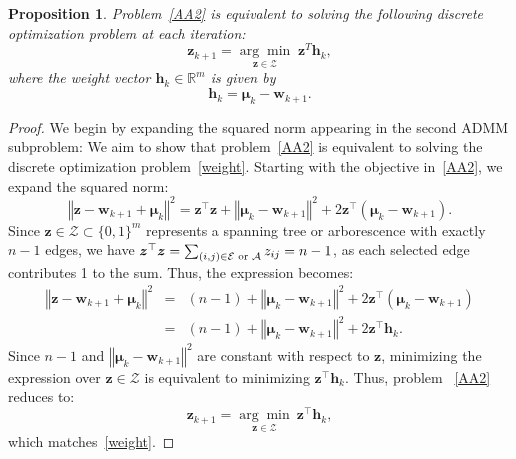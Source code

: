 \documentclass[10pt,a4paper]{amsart}
\newtheorem{proposition}{Proposition}
\begin{document}
	\begin{proposition}
		\label{Proposition} Problem~\eqref{AA2} is equivalent to solving the
		following discrete optimization problem at each iteration: 
		\begin{equation}
			\boldsymbol{z}_{k+1}=\underset{\boldsymbol{z}\in \mathcal{Z}}{\arg \min }\;%
			\boldsymbol{z}^{T}\boldsymbol{h}_{k},  \label{weight}
		\end{equation}%
		where the weight vector $\boldsymbol{h}_{k}\in \mathbb{R}^{m}$ is given by 
		\begin{equation}
			\boldsymbol{h}_{k}=\boldsymbol{\mu }_{k}-\boldsymbol{w}_{k+1}.  \label{h_k}
		\end{equation}%
	\end{proposition}

	\begin{proof}
		\label{Proof_prop} We begin by expanding the squared norm appearing in the
		second ADMM subproblem: We aim to show that problem~\eqref{AA2} is
		equivalent to solving the discrete optimization problem~\eqref{weight}.
		Starting with the objective in~\eqref{AA2}, we expand the squared norm: 
		\begin{equation*}
			\left\Vert \boldsymbol{z}-\boldsymbol{w}_{k+1}+\boldsymbol{\mu }%
			_{k}\right\Vert ^{2}=\boldsymbol{z}^{\top }\boldsymbol{z}+\left\Vert 
			\boldsymbol{\mu }_{k}-\boldsymbol{w}_{k+1}\right\Vert ^{2}+2\boldsymbol{z}%
			^{\top }\left( \boldsymbol{\mu }_{k}-\boldsymbol{w}_{k+1}\right) .
		\end{equation*}%
		Since $\boldsymbol{z}\in \mathcal{Z}\subset \{0,1\}^{m}$ represents a
		spanning tree or arborescence with exactly $n-1$ edges, we have $\boldsymbol{%
			z}^{\top }\boldsymbol{z}=\sum_{(i,j)\in \mathcal{E}\text{ or }\mathcal{A}%
		}z_{ij}=n-1$, as each selected edge contributes 1 to the sum. Thus, the
		expression becomes: 
		\begin{eqnarray*}
			\left\Vert \boldsymbol{z}-\boldsymbol{w}_{k+1}+\boldsymbol{\mu }%
			_{k}\right\Vert ^{2} &=&(n-1)+\left\Vert \boldsymbol{\mu }_{k}-\boldsymbol{w}%
			_{k+1}\right\Vert ^{2}+2\boldsymbol{z}^{\top }\left( \boldsymbol{\mu }_{k}-%
			\boldsymbol{w}_{k+1}\right)  \\
			&=&(n-1)+\left\Vert \boldsymbol{\mu }_{k}-\boldsymbol{w}_{k+1}\right\Vert
			^{2}+2\boldsymbol{z}^{\top }\boldsymbol{h}_{k}.
		\end{eqnarray*}%
		Since $n-1$ and $\left\Vert \boldsymbol{\mu }_{k}-\boldsymbol{w}%
		_{k+1}\right\Vert ^{2}$ are constant with respect to $\boldsymbol{z}$,
		minimizing the expression over $\boldsymbol{z}\in \mathcal{Z}$ is equivalent
		to minimizing $\boldsymbol{z}^{\top }\boldsymbol{h}_{k}$. Thus, problem~%
		\eqref{AA2} reduces to: 
		\begin{equation*}
			\boldsymbol{z}_{k+1}=\underset{\boldsymbol{z}\in \mathcal{Z}}{\arg \min }\ 
			\boldsymbol{z}^{\top }\boldsymbol{h}_{k},
		\end{equation*}%
		which matches~\eqref{weight}.
	\end{proof}
\end{document}
